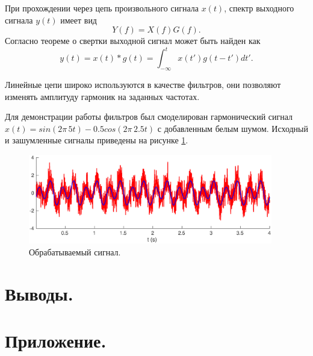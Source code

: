 \documentclass[a4paper,14pt]{extarticle}
\DeclareMathOperator{\sinc}{sinc}
\begin{document}
При прохождении через цепь произвольного сигнала $x(t)$, спектр выходного сигнала $y(t)$ имеет вид
\begin{equation*}
Y(f) = X(f) G(f).
\end{equation*}
Согласно теореме о свертки выходной сигнал может быть найден как 
\begin{equation*}
y(t) = x(t) * g(t) = \int_{-\infty}^{t} x(t')g(t - t') dt'.
\end{equation*}   

Линейные цепи широко используются в качестве фильтров, они позволяют  изменять амплитуду гармоник на заданных частотах. 


Для демонстрации работы фильтров был смоделирован гармонический  сигнал $x(t) = sin(2\pi \, 5 t) - 0.5 cos(2\pi \, 2.5 t)$ с добавленным белым шумом. Исходный и зашумленные сигналы приведены на рисунке \ref{sig}.
 
\begin{figure}[H]
\centering
\includegraphics[width=0.95\textwidth]{./signal.eps}
\captionsetup{justification=centering,margin=1cm}
\caption{Обрабатываемый сигнал.}
\label{sig}
\end{figure}

\section{Выводы.}

%
%
%

\section{Приложение.}


\end{document}
